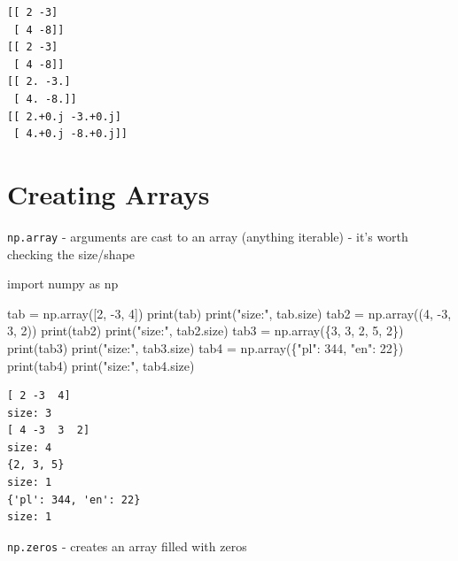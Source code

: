 \documentclass[
  english,
  letterpaper,
  DIV=11,
  numbers=noendperiod]{scrreprt}
\newenvironment{Shaded}{\begin{snugshade}}{\end{snugshade}}
\newcommand{\BuiltInTok}[1]{\textcolor[rgb]{0.00,0.23,0.31}{#1}}
\newcommand{\DecValTok}[1]{\textcolor[rgb]{0.68,0.00,0.00}{#1}}
\newcommand{\ImportTok}[1]{\textcolor[rgb]{0.00,0.46,0.62}{#1}}
\newcommand{\NormalTok}[1]{\textcolor[rgb]{0.00,0.23,0.31}{#1}}
\newcommand{\OperatorTok}[1]{\textcolor[rgb]{0.37,0.37,0.37}{#1}}
\newcommand{\StringTok}[1]{\textcolor[rgb]{0.13,0.47,0.30}{#1}}
\begin{document}
\begin{verbatim}
[[ 2 -3]
 [ 4 -8]]
[[ 2 -3]
 [ 4 -8]]
[[ 2. -3.]
 [ 4. -8.]]
[[ 2.+0.j -3.+0.j]
 [ 4.+0.j -8.+0.j]]
\end{verbatim}

\chapter{Creating Arrays}\label{creating-arrays}

\texttt{np.array} - arguments are cast to an array (anything iterable) -
it's worth checking the size/shape

\begin{Shaded}
\begin{Highlighting}[]
\ImportTok{import}\NormalTok{ numpy }\ImportTok{as}\NormalTok{ np}

\NormalTok{tab }\OperatorTok{=}\NormalTok{ np.array([}\DecValTok{2}\NormalTok{, }\OperatorTok{{-}}\DecValTok{3}\NormalTok{, }\DecValTok{4}\NormalTok{])}
\BuiltInTok{print}\NormalTok{(tab)}
\BuiltInTok{print}\NormalTok{(}\StringTok{"size:"}\NormalTok{, tab.size)}
\NormalTok{tab2 }\OperatorTok{=}\NormalTok{ np.array((}\DecValTok{4}\NormalTok{, }\OperatorTok{{-}}\DecValTok{3}\NormalTok{, }\DecValTok{3}\NormalTok{, }\DecValTok{2}\NormalTok{))}
\BuiltInTok{print}\NormalTok{(tab2)}
\BuiltInTok{print}\NormalTok{(}\StringTok{"size:"}\NormalTok{, tab2.size)}
\NormalTok{tab3 }\OperatorTok{=}\NormalTok{ np.array(\{}\DecValTok{3}\NormalTok{, }\DecValTok{3}\NormalTok{, }\DecValTok{2}\NormalTok{, }\DecValTok{5}\NormalTok{, }\DecValTok{2}\NormalTok{\})}
\BuiltInTok{print}\NormalTok{(tab3)}
\BuiltInTok{print}\NormalTok{(}\StringTok{"size:"}\NormalTok{, tab3.size)}
\NormalTok{tab4 }\OperatorTok{=}\NormalTok{ np.array(\{}\StringTok{"pl"}\NormalTok{: }\DecValTok{344}\NormalTok{, }\StringTok{"en"}\NormalTok{: }\DecValTok{22}\NormalTok{\})}
\BuiltInTok{print}\NormalTok{(tab4)}
\BuiltInTok{print}\NormalTok{(}\StringTok{"size:"}\NormalTok{, tab4.size)}
\end{Highlighting}
\end{Shaded}

\begin{verbatim}
[ 2 -3  4]
size: 3
[ 4 -3  3  2]
size: 4
{2, 3, 5}
size: 1
{'pl': 344, 'en': 22}
size: 1
\end{verbatim}

\texttt{np.zeros} - creates an array filled with zeros
\end{document}
